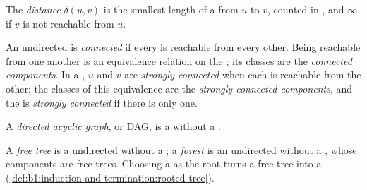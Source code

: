 \begin{definition}[Distance]\label{def:b1:graph-traversals:distance}
The \emph{distance} $\delta(u, v)$ is the smallest length of a  from $u$ to $v$, counted in
, and $\infty$ if $v$ is not reachable from $u$.
\end{definition}

\begin{definition}\label{def:b1:graph-traversals:connected}
An undirected  is \emph{connected} if every  is reachable from every other. Being
reachable from one another is an equivalence relation on the ; its classes are the \emph{connected
components}. In a , $u$ and $v$ are \emph{strongly connected} when
each is reachable from the other; the classes of this equivalence are the \emph{strongly connected
components}, and the  is \emph{strongly connected} if there is only one.
\end{definition}

\begin{definition}\label{def:b1:graph-traversals:dag}
A \emph{directed acyclic graph}, or DAG, is a  without a .
\end{definition}

\begin{definition}\label{def:b1:graph-traversals:free-tree}
A \emph{free tree} is a  undirected  without a ; a \emph{forest} is
an undirected  without a , whose components are free trees. Choosing a  as the root turns a free tree
into a  (\cref{def:b1:induction-and-termination:rooted-tree}).
\end{definition}


